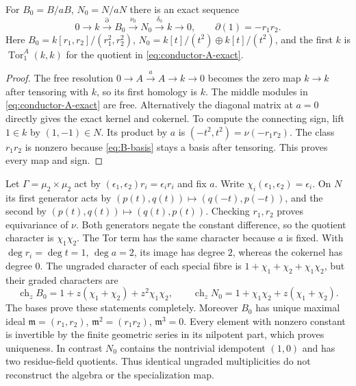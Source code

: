 \begin{proposition}\label{prop:spec-defect}
For $B_0=B/aB$, $N_0=N/aN$ there is an exact sequence
\[
 0\longrightarrow k\xrightarrow{\partial}B_0
 \xrightarrow{\nu_0}N_0\xrightarrow{\delta_0}k\longrightarrow0,
 \qquad \partial(1)=-r_1r_2.
\]
Here $B_0=k[r_1,r_2]/(r_1^2,r_2^2)$,
$N_0=k[t]/(t^2)\oplus k[t]/(t^2)$, and the first $k$ is
$\operatorname{Tor}^A_1(k,k)$ for the quotient in
\eqref{eq:conductor-A-exact}.
\end{proposition}
\begin{proof}
The free resolution $0\to A\xrightarrow{a}A\to k\to0$ becomes
the zero map $k\to k$ after tensoring with $k$, so its first homology
is $k$. The middle modules in \eqref{eq:conductor-A-exact} are free.
Alternatively the diagonal matrix at $a=0$ directly gives the exact
kernel and cokernel. To compute the connecting sign, lift $1\in k$
by $(1,-1)\in N$. Its product by $a$ is
$(-t^2,t^2)=\nu(-r_1r_2)$.
The class $r_1r_2$ is nonzero because \eqref{eq:B-basis} stays a basis
after tensoring. This proves every map and sign.
\end{proof}

Let $\Gamma=\mu_2\times\mu_2$ act by
$(\epsilon_1,\epsilon_2)r_i=\epsilon_i r_i$ and fix $a$.
Write $\chi_i(\epsilon_1,\epsilon_2)=\epsilon_i$.
On $N$ its first generator acts by
$(p(t),q(t))\mapsto(q(-t),p(-t))$, and the second by
$(p(t),q(t))\mapsto(q(t),p(t))$.
Checking $r_1,r_2$ proves equivariance of $\nu$.
Both generators negate the constant difference, so the quotient
character is $\chi_1\chi_2$. The Tor term has the same character
because $a$ is fixed. With $\deg r_i=\deg t=1$, $\deg a=2$, its
image has degree $2$, whereas the cokernel has degree $0$.
The ungraded character of each special fibre is
$1+\chi_1+\chi_2+\chi_1\chi_2$, but their graded characters are
\[
 \operatorname{ch}_zB_0=1+z(\chi_1+\chi_2)+z^2\chi_1\chi_2,
 \qquad
 \operatorname{ch}_zN_0=1+\chi_1\chi_2+z(\chi_1+\chi_2).
\]
The bases prove these statements completely.
Moreover $B_0$ has unique maximal ideal $\mathfrak m=(r_1,r_2)$,
$\mathfrak m^2=(r_1r_2)$, $\mathfrak m^3=0$.
Every element with nonzero constant is invertible by the finite
geometric series in its nilpotent part, which proves uniqueness.
In contrast $N_0$ contains the nontrivial idempotent $(1,0)$ and has
two residue-field quotients. Thus identical ungraded multiplicities
do not reconstruct the algebra or the specialization map.


